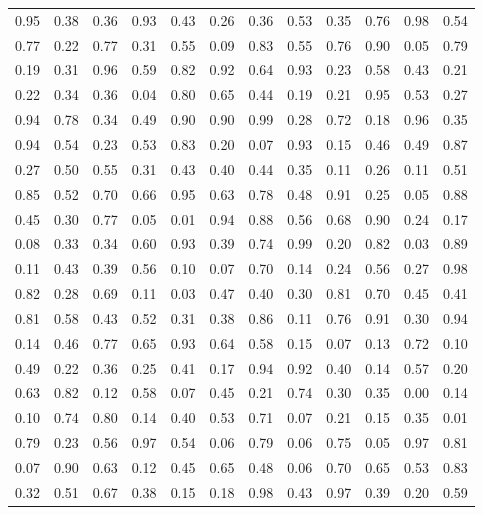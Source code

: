 \begin{center}
\setlength{\tabcolsep}{10pt}
\renewcommand{\arraystretch}{1.25}
\begin{tabular}{llllllllllll}
0.95 & 0.38 & 0.36 & 0.93 & 0.43 & 0.26 & 0.36 & 0.53 & 0.35 & 0.76 & 0.98 & 0.54 \\
0.77 & 0.22 & 0.77 & 0.31 & 0.55 & 0.09 & 0.83 & 0.55 & 0.76 & 0.90 & 0.05 & 0.79 \\
0.19 & 0.31 & 0.96 & 0.59 & 0.82 & 0.92 & 0.64 & 0.93 & 0.23 & 0.58 & 0.43 & 0.21 \\
0.22 & 0.34 & 0.36 & 0.04 & 0.80 & 0.65 & 0.44 & 0.19 & 0.21 & 0.95 & 0.53 & 0.27 \\
0.94 & 0.78 & 0.34 & 0.49 & 0.90 & 0.90 & 0.99 & 0.28 & 0.72 & 0.18 & 0.96 & 0.35 \\
0.94 & 0.54 & 0.23 & 0.53 & 0.83 & 0.20 & 0.07 & 0.93 & 0.15 & 0.46 & 0.49 & 0.87 \\
0.27 & 0.50 & 0.55 & 0.31 & 0.43 & 0.40 & 0.44 & 0.35 & 0.11 & 0.26 & 0.11 & 0.51 \\
0.85 & 0.52 & 0.70 & 0.66 & 0.95 & 0.63 & 0.78 & 0.48 & 0.91 & 0.25 & 0.05 & 0.88 \\
0.45 & 0.30 & 0.77 & 0.05 & 0.01 & 0.94 & 0.88 & 0.56 & 0.68 & 0.90 & 0.24 & 0.17 \\
0.08 & 0.33 & 0.34 & 0.60 & 0.93 & 0.39 & 0.74 & 0.99 & 0.20 & 0.82 & 0.03 & 0.89 \\
0.11 & 0.43 & 0.39 & 0.56 & 0.10 & 0.07 & 0.70 & 0.14 & 0.24 & 0.56 & 0.27 & 0.98 \\
0.82 & 0.28 & 0.69 & 0.11 & 0.03 & 0.47 & 0.40 & 0.30 & 0.81 & 0.70 & 0.45 & 0.41 \\
0.81 & 0.58 & 0.43 & 0.52 & 0.31 & 0.38 & 0.86 & 0.11 & 0.76 & 0.91 & 0.30 & 0.94 \\
0.14 & 0.46 & 0.77 & 0.65 & 0.93 & 0.64 & 0.58 & 0.15 & 0.07 & 0.13 & 0.72 & 0.10 \\
0.49 & 0.22 & 0.36 & 0.25 & 0.41 & 0.17 & 0.94 & 0.92 & 0.40 & 0.14 & 0.57 & 0.20 \\
0.63 & 0.82 & 0.12 & 0.58 & 0.07 & 0.45 & 0.21 & 0.74 & 0.30 & 0.35 & 0.00 & 0.14 \\
0.10 & 0.74 & 0.80 & 0.14 & 0.40 & 0.53 & 0.71 & 0.07 & 0.21 & 0.15 & 0.35 & 0.01 \\
0.79 & 0.23 & 0.56 & 0.97 & 0.54 & 0.06 & 0.79 & 0.06 & 0.75 & 0.05 & 0.97 & 0.81 \\
0.07 & 0.90 & 0.63 & 0.12 & 0.45 & 0.65 & 0.48 & 0.06 & 0.70 & 0.65 & 0.53 & 0.83 \\
0.32 & 0.51 & 0.67 & 0.38 & 0.15 & 0.18 & 0.98 & 0.43 & 0.97 & 0.39 & 0.20 & 0.59 \\

\end{tabular}
\end{center}

